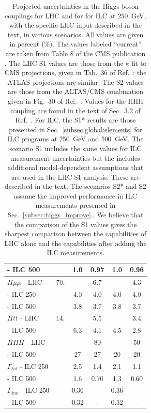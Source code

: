 \begin{table}[!htbp]
\begin{center}
\begin{tabular}{lccccc}
 \phantom{$H\gamma\gamma$} - ILC 500  &      &   1.0  &  0.97 &   1.0  &  0.96\\ 
\hline 
$H\mu\mu$ - LHC  &   70.        &        &    6.7  &        & 4.3 \\ 
\phantom{$H\mu\mu$} - ILC 250 &      &  4.0  &  4.0  &  4.0  &  4.0 \\ 
\phantom{$H\mu\mu$} - ILC 500 &      &  3.8  &  3.7  &  3.8  & 3.7\\ 
     \hline 
$Htt$ - LHC  &   14.        &        &           5.5   &        &  3.4
  \\  
 \phantom{$Htt$} - ILC 500  &        &    6.3    &     4.1     &    4.5   & 2.8
\\ 
\hline 
$HHH$ - LHC  &         &        &  80  &        &    50
  \\  
 \phantom{$HHH$} - ILC 500  &        &    27  &    27      &   20  & 20
\\ 
\hline \hline
$\Gamma_{tot}$ - ILC 250 &  &   2.5   &   1.4    &    2.1   & 1.1   \\ 
\phantom{$\Gamma_{tot}$} - ILC 500 & & 1.6 & 0.70 & 1.3  &  0.60  \\  \hline
$\Gamma_{inv}$ - ILC 250 &  &   0.36   &    -     &   0.36   &   -  \\ 
\phantom{$\Gamma_{inv}$} - ILC 500 & & 0.32 &  - & 0.32  & - \\  \hline
\end{tabular}
\end{center}
\caption{ \label{tab:ILCLHC}   Projected uncertainties in the Higgs
  boson couplings for LHC and for for ILC at 250~GeV, with the
  specific LHC input described in the text, 
in various scenarios.   All values
  are given in percent (\%). The values labeled ``current'' are taken
  from Table 8 of the CMS publication \cite{Sirunyan:2018koj}.   The
  LHC S1 values are those from the $\kappa$ fit to CMS projections,
  given in Tab.~36 of Ref.~\cite{Cepeda:2019klc}; the ATLAS projections are
  similar.    The S2 values are those from the ALTAS/CMS combination
  given in  Fig.~30 of Ref.~\cite{Cepeda:2019klc}.  Values for the HHH
  coupling are found in the text of Sec.~3.2 of 
Ref.~\cite{Cepeda:2019klc}. For ILC, the S1*
  results are those presented in Sec.~\ref{subsec:global:elements} for
  ILC programs at 250~GeV and 500~GeV.   The scenario S1 includes the 
same values for ILC measurement uncertainties but the  includes additional
model-dependent assumptions that are used in the LHC S1 analysis.
These are described in the text.  The
scenarios
S2* and S2 assume the improved performance in ILC measurements
presented in Sec.~\ref{subsec:higgs_improve}..  We believe that the 
comparison of the S1
  values  gives the sharpest comparison between the capabilities of LHC
  alone and the capabilities after adding the ILC measurements. }
\end{table}

